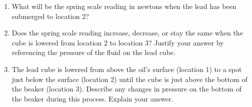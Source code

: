 \documentclass{../../../oss-classkick}
\begin{document}
\begin{enumerate}
  \begin{enumerate}
  \item What will be the spring scale reading in newtons when the lead has
    been submerged to location 2?
    \vspace{\stretch1}
    
  \item Does the spring scale reading increase, decrease, or stay the same
    when the cube is lowered from location 2 to location 3? Justify your
    answer by referencing the pressure of the fluid on the lead cube.
    \vspace{\stretch1}
    
  \item The lead cube is lowered from above the oil's surface (location 1) to
    a spot just below the surface (location 2) until the cube is just above
    the bottom of the beaker (location 3). Describe any changes in pressure
    on the bottom of the beaker during this process. Explain your answer.
    \vspace{\stretch1}
  \end{enumerate}
\end{enumerate}
\end{document}
